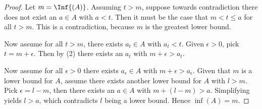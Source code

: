 \documentclass[10pt,twoside,openany]{memoir}
\begin{document}
        {\color{red} \begin{proof}
            Let $m = \Inf{(A)}$. Assuming $t > m$, suppose towards contradiction there does not exist an $a \in A$ with $a < t$. Then it must be the case that $m < t \leq a$ for all $t > m$. This is a contradiction, because $m$ is the greatest lower bound.

            Now assume for all $t > m$, there exists $a_t \in A$ with $a_t < t$. Given $\epsilon > 0$, pick $t = m + \epsilon$. Then by (2) there exists an $a_t$ with $m+ \epsilon > a_t$.

            Now assume for all $\epsilon >0$ there exists $a_\epsilon \in A$ with $m + \epsilon > a_\epsilon$. Given that $m$ is a lower bound for $A$, assume there exists another lower bound for $A$ with $l > m$. Pick $\epsilon = l - m$, then there exists an $a \in A$ with $m + (l - m) > a$. Simplifying yields $l > a$, which contradicts $l$ being a lower bound. Hence $\inf{(A)} = m$.
        \end{proof}}
\end{document}
